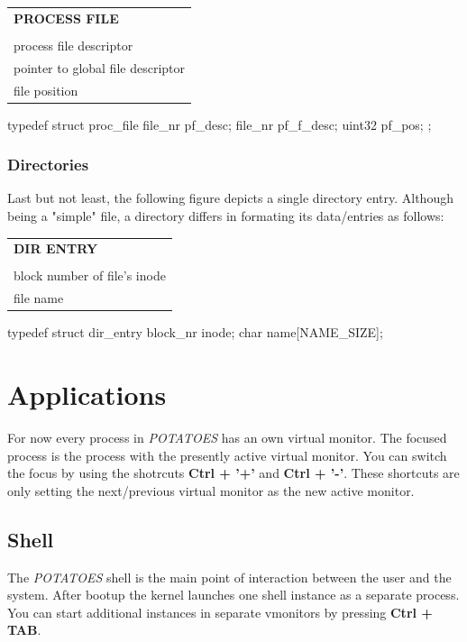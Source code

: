 \documentclass[11pt,a4paper]{scrartcl}
\begin{document}
\vspace{0.3cm}
\begin{tabular}{|l|}
\hline
\textbf{PROCESS FILE}\\\\\hline
process file descriptor\\\hline
pointer to global file descriptor\\\hline
file position\\\hline
\end{tabular}

\begin{code}
typedef struct proc_file {
		file_nr pf_desc;
		file_nr pf_f_desc;
		uint32 pf_pos;
};       
\end{code}
\subsubsection{Directories}
Last but not least, the following figure depicts a single directory entry. Although being a "simple" file, a directory differs in formating its data/entries as follows:

\vspace{0.3cm}
\begin{tabular}{|l|}
\hline
\textbf{DIR ENTRY}\\\\\hline
block number of file's inode\\\hline
file name\\\hline
\end{tabular}

\begin{code}
typedef struct dir_entry {
		block_nr inode;
		char name[NAME_SIZE];
}
\end{code}
\pagebreak
\section{Applications}

For now every process in \textit{POTATOES} has an own virtual monitor. The focused process is the process with the presently active virtual monitor. You can switch the focus by using the shotrcuts \textbf{Ctrl + '+'} and \textbf{Ctrl + '-'}. These shortcuts are only setting the next/previous virtual monitor as the new active monitor.

\subsection{Shell}
The \textit{POTATOES} shell is the main point of interaction between the user and the system. After bootup the kernel launches one shell instance as a separate process. You can start additional instances in separate vmonitors by pressing \textbf{Ctrl + TAB}.
\end{document}
